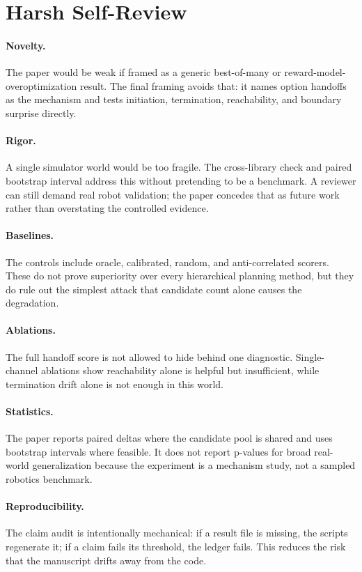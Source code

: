 \documentclass{article}
\begin{document}
\section{Harsh Self-Review}

\paragraph{Novelty.}
The paper would be weak if framed as a generic best-of-many or reward-model-overoptimization result. The final framing avoids that: it names option handoffs as the mechanism and tests initiation, termination, reachability, and boundary surprise directly.

\paragraph{Rigor.}
A single simulator world would be too fragile. The cross-library check and paired bootstrap interval address this without pretending to be a benchmark. A reviewer can still demand real robot validation; the paper concedes that as future work rather than overstating the controlled evidence.

\paragraph{Baselines.}
The controls include oracle, calibrated, random, and anti-correlated scorers. These do not prove superiority over every hierarchical planning method, but they do rule out the simplest attack that candidate count alone causes the degradation.

\paragraph{Ablations.}
The full handoff score is not allowed to hide behind one diagnostic. Single-channel ablations show reachability alone is helpful but insufficient, while termination drift alone is not enough in this world.

\paragraph{Statistics.}
The paper reports paired deltas where the candidate pool is shared and uses bootstrap intervals where feasible. It does not report p-values for broad real-world generalization because the experiment is a mechanism study, not a sampled robotics benchmark.

\paragraph{Reproducibility.}
The claim audit is intentionally mechanical: if a result file is missing, the scripts regenerate it; if a claim fails its threshold, the ledger fails. This reduces the risk that the manuscript drifts away from the code.
\end{document}
